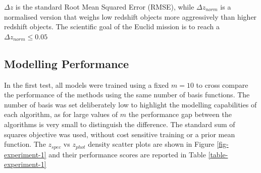 \documentclass[useAMS,usenatbib,fleqn]{mn2e}
\begin{document}
$\Delta z$ is the standard Root Mean Squared Error (RMSE), while $\Delta z_{norm}$ is a normalised version that weighs low redshift objects more aggressively than higher redshift objects. The scientific goal of the Euclid mission is to reach a $\Delta z_{norm} \le 0.05$

\subsection{Modelling Performance}

In the first test, all models were trained using a fixed $m=10$ to cross compare the performance of the methods using the same number of basis functions. The number of basis was set deliberately low to highlight the modelling capabilities of each algorithm, as for large values of $m$ the performance gap between the algorithms is very small to distinguish the difference. The standard sum of squares objective was used, without cost sensitive training or a prior mean function. The $z_{spec}$ vs $z_{phot}$ density scatter plots are shown in Figure \ref{fig-experiment-1} and their performance scores are reported in Table \ref{table-experiment-1}
\end{document}
